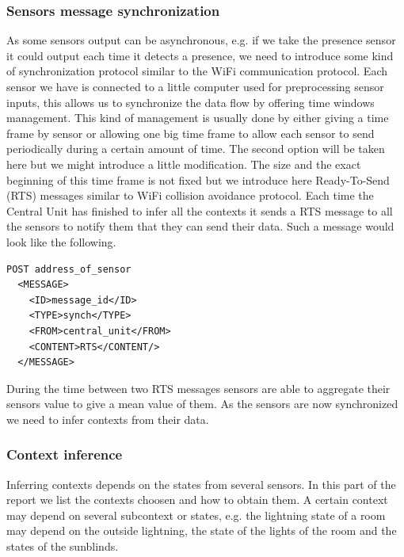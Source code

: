 \documentclass{acm_proc_article-sp}
\begin{document}
\subsubsection{Sensors message synchronization}
As some sensors output can be asynchronous, e.g. if we take the presence sensor it could output each time it detects a presence, we need to introduce some kind of synchronization protocol similar to the WiFi communication protocol.
Each sensor we have is connected to a little computer used for preprocessing sensor inputs, this allows us to synchronize the data flow by offering time windows management.
This kind of management is usually done by either giving a time frame by sensor or allowing one big time frame to allow each sensor to send periodically during a certain amount of time.
The second option will be taken here but we might introduce a little modification. 
The size and the exact beginning of this time frame is not fixed but we introduce here Ready-To-Send (RTS) messages similar to WiFi collision avoidance protocol.
Each time the Central Unit has finished to infer all the contexts it sends a RTS message to all the sensors to notify them that they can send their data.
Such a message would look like the following.
\begin{verbatim}
POST address_of_sensor 
  <MESSAGE>
    <ID>message_id</ID>
    <TYPE>synch</TYPE>
    <FROM>central_unit</FROM>
    <CONTENT>RTS</CONTENT/>
  </MESSAGE> 
\end{verbatim}
During the time between two RTS messages sensors are able to aggregate their sensors value to give a mean value of them.
As the sensors are now synchronized we need to infer contexts from their data.

\subsubsection{Context inference}
Inferring contexts depends on the states from several sensors. In this part of the report we list the contexts choosen and how to obtain them.
A certain context may depend on several subcontext or states, 
e.g. the lightning state of a room may depend on the outside lightning, the state of the lights of the room and the states of the sunblinds.
\end{document}
